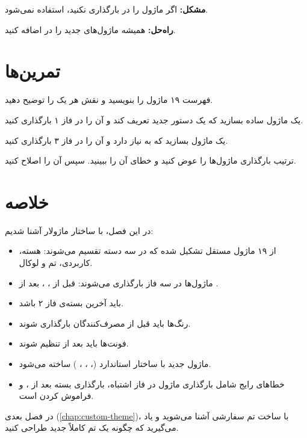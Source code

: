 \textbf{مشکل:} اگر ماژول را در
 بارگذاری نکنید،
استفاده نمی‌شود.

\textbf{راه‌حل:} همیشه ماژول‌های جدید را
در  اضافه کنید.

\section{تمرین‌ها}
\label{sec:modules-exercises}

\begin{exercise}
    فهرست ۱۹ ماژول  را بنویسید
    و نقش هر یک را توضیح دهید.
    \label{exc:modules-list}
\end{exercise}

\begin{exercise}
    یک ماژول ساده بسازید که یک دستور جدید
    تعریف کند و آن را در فاز ۱ بارگذاری
    کنید.
    \label{exc:modules-add}
\end{exercise}

\begin{exercise}
    یک ماژول بسازید که به 
    نیاز دارد و آن را در فاز ۳ بارگذاری
    کنید.
    \label{exc:modules-phase3}
\end{exercise}

\begin{exercise}
    ترتیب بارگذاری ماژول‌ها را عوض کنید و
    خطای آن را ببینید. سپس آن را اصلاح
    کنید.
    \label{exc:modules-order}
\end{exercise}

\section{خلاصه}
\label{sec:modules-summary}

در این فصل، با ساختار ماژولار 
آشنا شدیم:

\begin{itemize}
    \item {} از ۱۹ ماژول مستقل
    تشکیل شده که در سه دسته تقسیم می‌شوند:
    هسته، کاربردی، تم و لوکال.

    \item ماژول‌ها در سه فاز بارگذاری
    می‌شوند: قبل از ،
    ، بعد از .

    \item {} باید آخرین بسته‌ی
    فاز ۲ باشد.

    \item رنگ‌ها باید قبل از مصرف‌کنندگان
    بارگذاری شوند.

    \item فونت‌ها باید بعد از 
    تنظیم شوند.

    \item ماژول جدید با ساختار استاندارد
    (،
    ، ،
    ) ساخته می‌شود.

    \item خطاهای رایج شامل بارگذاری ماژول
    در فاز اشتباه، بارگذاری بسته بعد از
    ، و فراموش کردن
     است.
\end{itemize}

در فصل بعدی (\cref{chap:custom-theme})،
با ساخت تم سفارشی آشنا می‌شوید و یاد
می‌گیرید که چگونه یک تم کاملاً جدید طراحی
کنید.